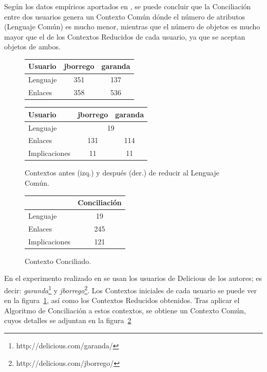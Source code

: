 Según los datos empíricos aportados en \cite{algoritmo}, se puede concluir que la Conciliación entre dos usuarios genera un Contexto Común dónde el número de atributos (Lenguaje Común) es mucho menor, mientras que el número de objetos es mucho mayor que el de los Contextos Reducidos de cada usuario, ya que se aceptan objetos de ambos.



\begin{figure}[t]
  \begin{minipage}[b]{0.45\linewidth}\centering
	\begin{tabular}{l c c}
	\hline
	Usuario & jborrego & garanda \\ \hline
	Lenguaje & 351 & 137 \\ \hline
	Enlaces & 358 & 536 \\ \hline
	\end{tabular}
  \end{minipage}
\hspace{0.5cm}
   \begin{minipage}[b]{0.45\linewidth}
    \centering
	\begin{tabular}{l c c}
	\hline
	Usuario & jborrego & garanda \\ \hline
	Lenguaje & \multicolumn{2}{c}{19} \\ \hline
	Enlaces & 131 & 114 \\ \hline
	Implicaciones & 11 & 11 \\ \hline
	\end{tabular}
   \end{minipage}
\caption{Contextos antes (izq.) y después (der.) de reducir al Lenguaje Común.}
\label{fig:tabla1}
\end{figure}

\begin{figure}[t]\centering
	\begin{tabular}{l c}
	\hline
	 & Conciliación \\ \hline
	Lenguaje & 19 \\ \hline
	Enlaces & 245 \\ \hline
	Implicaciones & 121 \\ \hline
	\end{tabular}
\caption{Contexto Conciliado.}
\label{fig:tabla2}
\end{figure}

En el experimento realizado en \cite{algoritmo} se usan los usuarios de Delicious de los autores; es decir: {\em garanda}\footnote{http://delicious.com/garanda/} y {\em jborrego}\footnote{http://delicious.com/jborrego/}. Los Contextos iniciales de cada usuario se puede ver en la figura~\ref{fig:tabla1}, así como los Contextos Reducidos obtenidos. Tras aplicar el Algoritmo de Conciliación a estos contextos, se obtiene un Contexto Común, cuyos detalles se adjuntan en la figura~\ref{fig:tabla2}

